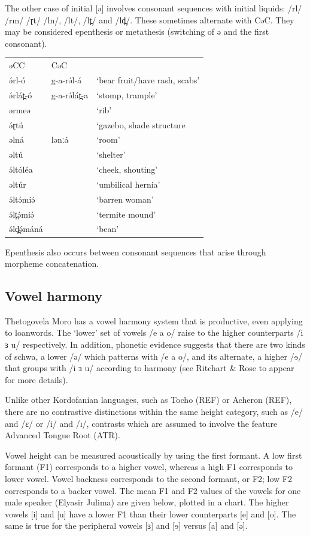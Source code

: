 The other case of initial [ə] involves consonant sequences with initial liquids: /rl/ /rm/ /ɽt/ /ln/, /lt/, /lt̪/ and /ld̪/. These sometimes alternate with CəC. They may be considered epenthesis or metathesis (switching of ə and the first consonant). 

\ea
\begin{tabular}[t]{lll}
əCC	&	CəC\\
ə́rl-ó	&	g-a-rə́l-á	&	‘bear fruit/have rash, scabs’\\
ə́rlát̪-ó	&	g-a-rə́lát̪-a	&	‘stomp, trample’\\
ərmeə	&				&	‘rib’\\
ə́ɽtú		&				&	‘gazebo, shade structure\\
əlná	&	lənːá		&	‘room’\\
əltú		&				&	‘shelter’\\
ə́ltóléa		&				&	‘cheek, shouting’\\
əltúr		&				&	‘umbilical hernia’\\
ə́ltə́miə́		&				&	‘barren woman’\\
ə́lt̪ə́miə́		&				&	‘termite mound’\\
ə́ld̪ə́máná		&				&	‘bean’\\
\end{tabular}
\z

Epenthesis also occurs between consonant sequences that arise through morpheme concatenation.


\subsection{Vowel harmony}\label{section:vharmony}
Thetogovela Moro has a vowel harmony system that is productive, even applying to loanwords. The ‘lower’ set of vowels /e a o/ raise to the higher counterparts /i ɜ u/ respectively. In addition, phonetic evidence suggests that there are two kinds of schwa, a lower /ə/ which patterns with /e a o/, and its alternate, a higher /ɘ/ that groups with /i ɜ u/ according to harmony (see Ritchart \& Rose to appear for more details).

Unlike other Kordofanian languages, such as Tocho (REF) or Acheron (REF), there are no contrastive distinctions within the same height category, such as /e/ and /ɛ/ or /i/ and /ɪ/, contrasts which are assumed to involve the feature Advanced Tongue Root (ATR).

Vowel height can be measured acoustically by using the first formant. A low first formant (F1) corresponds to a higher vowel, whereas a high F1 corresponds to lower vowel. Vowel backness corresponds to the second formant, or F2; low F2 corresponds to a backer vowel. The mean F1 and F2 values of the vowels for one male speaker (Elyasir Julima) are given below, plotted in a chart. The higher vowels [i] and [u] have a lower F1 than their lower counterparts [e] and [o]. The same is true for the peripheral vowels [ɜ] and [ɘ] versus [a] and [ə].

